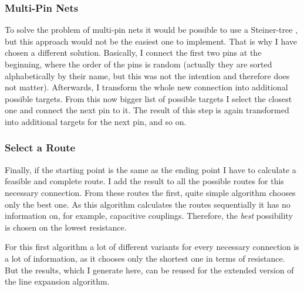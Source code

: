 \subsubsection{Multi-Pin Nets}
To solve the problem of multi-pin nets it would be possible to use a Steiner-tree , but this approach would not be the easiest one to implement. That is why I have chosen a different solution. Basically, I connect the first two pins at the beginning, where the order of the pins is random (actually they are sorted alphabetically by their name, but this was not the intention and therefore does not matter). Afterwards, I transform the whole new connection into additional possible targets. From this now bigger list of possible targets I select the closest one and connect the next pin to it. The result of this step is again transformed into additional targets for the next pin, and so on.

\subsubsection{Select a Route}
Finally, if the starting point is the same as the ending point I have to calculate a feasible and complete route. I add the result to all the possible routes for this necessary connection. From these routes the first, quite simple algorithm chooses only the best one. As this algorithm calculates the routes sequentially it has no information on, for example, capacitive couplings. Therefore, the \emph{best} possibility is chosen on the lowest resistance.

For this first algorithm a lot of different variants for every necessary connection is a lot of information, as it chooses only the shortest one in terms of resistance. But the results, which I generate here, can be reused for the extended version of the line expansion algorithm.

